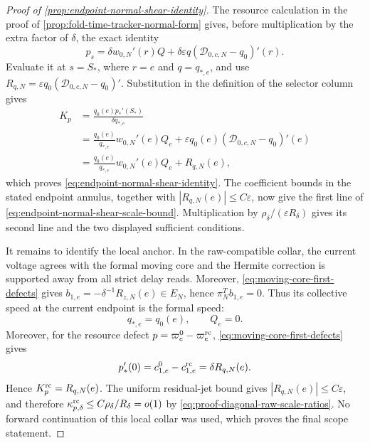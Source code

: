 \begin{proof}[Proof of
\cref{prop:endpoint-normal-shear-identity}]
The resource calculation in the proof of
\cref{prop:fold-time-tracker-normal-form} gives, before multiplication by
the extra factor of \(\delta\), the exact identity
\begin{equation}
 p_s=\delta w_{0,N}'(r)Q
       +\delta\varepsilon q
          (\mathcal D_{0,c,N}-q_0)'(r).          \label{eq:proof-endpoint-resource-speed}
\end{equation}
Evaluate it at \(s=S_*\), where \(r=e\) and \(q=q_{*,e}\), and use
\(
 R_{q,N}=\varepsilon q_0
       (\mathcal D_{0,c,N}-q_0)'
\).  Substitution in the definition of the selector column gives
\begin{align*}
 K_p
 &=\frac{q_0(e)p_*'(S_*)}{\delta q_{*,e}}\\
 &=\frac{q_0(e)}{q_{*,e}}w_{0,N}'(e)Q_e
   +\varepsilon q_0(e)
       (\mathcal D_{0,c,N}-q_0)'(e)\\
 &=\frac{q_0(e)}{q_{*,e}}w_{0,N}'(e)Q_e+R_{q,N}(e),
\end{align*}
which proves \cref{eq:endpoint-normal-shear-identity}.  The coefficient
bounds in the stated endpoint annulus, together with
\(|R_{q,N}(e)|\le C\varepsilon\), now give the first line of
\cref{eq:endpoint-normal-shear-scale-bound}.  Multiplication by
\(\rho_\delta/(\varepsilon R_\delta)\) gives its second line and the two
displayed sufficient conditions.

It remains to identify the local anchor.  In the raw-compatible collar,
the current voltage agrees with the formal moving core and the Hermite
correction is supported away from all strict delay reads.  Moreover,
\cref{eq:moving-core-first-defects} gives
\(
 b_{1,e}=-\delta^{-1}R_{z,N}(e)\in E_N
\), hence \(\pi_N^Tb_{1,e}=0\).  Thus its collective speed at the current
endpoint is the formal speed:
\begin{equation*}
 q_{*,e}=q_0(e),\qquad Q_e=0.
\end{equation*}
Moreover, for the resource defect
\(p=\varpi_e^0-\varpi_e^{\rm rc}\),
\cref{eq:moving-core-first-defects} gives
\begin{equation*}
 p_*'(0)=c_{1,e}^0-c_{1,e}^{\rm rc}
        =\delta R_{q,N}(e).
\end{equation*}
Hence \(K_p^{\rm rc}=R_{q,N}(e)\).  The uniform residual-jet bound gives
\(|R_{q,N}(e)|\le C\varepsilon\), and therefore
\(
 \kappa_{p,\delta}^{\rm rc}
 \le C\rho_\delta/R_\delta=o(1)
\)
by \cref{eq:proof-diagonal-raw-scale-ratios}.  No forward continuation
of this local collar was used, which proves the final scope statement.
\end{proof}

